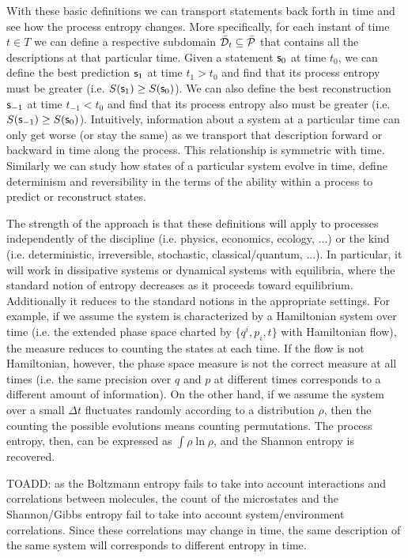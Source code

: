 \documentclass[10pt, onecolumn, longbibliography, nofootinbib]{revtex4-2}
\begin{document}
With these basic definitions we can transport statements back forth in time and see how the process entropy changes. More specifically, for each instant of time $t \in T$ we can define a respective subdomain $\tdomain_t \subseteq \tdomain[P]$ that contains all the descriptions at that particular time. Given a statement $\stmt_0$ at time $t_0$, we can define the best prediction $\stmt_1$ at time $t_1 > t_0$ and find that its process entropy must be greater (i.e. $S(\stmt_1) \geq S(\stmt_0)$). We can also define the best reconstruction $\stmt_{-1}$ at time $t_{-1} < t_0$ and find that its process entropy also must be greater (i.e. $S(\stmt_{-1}) \geq S(\stmt_0)$). Intuitively, information about a system at a particular time can only get worse (or stay the same) as we transport that description forward or backward in time along the process. This relationship is symmetric with time. Similarly we can study how states of a particular system evolve in time, define determinism and reversibility in the terms of the ability within a process to predict or reconstruct states.

The strength of the approach is that these definitions will apply to processes independently of the discipline (i.e. physics, economics, ecology, ...)  or the kind (i.e. deterministic, irreversible, stochastic, classical/quantum, ...). In particular, it will work in dissipative systems or dynamical systems with equilibria, where the standard notion of entropy decreases as it proceeds toward equilibrium. Additionally it reduces to the standard notions in the appropriate settings. For example, if we assume the system is characterized by a Hamiltonian system over time (i.e. the extended phase space charted by $\{q^i, p_i, t\}$ with Hamiltonian flow), the measure reduces to counting the states at each time. If the flow is not Hamiltonian, however, the phase space measure is not the correct measure at all times (i.e. the same precision over $q$ and $p$ at different times corresponds to a different amount of information). On the other hand, if we assume the system over a small $\Delta t$ fluctuates randomly according to a distribution $\rho$, then the counting the possible evolutions means counting permutations. The process entropy, then, can be expressed as $\int \rho \ln \rho$, and the Shannon entropy is recovered.

TOADD: as the Boltzmann entropy fails to take into account interactions and correlations between molecules, the count of the microstates and the Shannon/Gibbs entropy fail to take into account system/environment correlations. Since these correlations may change in time, the same description of the same system will corresponds to different entropy in time.
\end{document}
